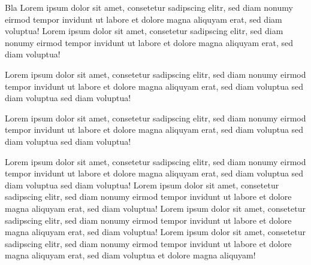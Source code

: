 \documentclass[
parindent=false,
parskip=true,
parts=true,
colortheme=wu,
styletheme=wu,
shownotess=true,
showresults=false
]{edu}
\begin{document}
\begin{cols}[4]
	Bla Lorem ipsum dolor sit amet, consetetur sadipscing elitr, sed diam nonumy eirmod tempor invidunt ut labore et dolore magna aliquyam erat, sed diam voluptua! Lorem ipsum dolor sit amet, consetetur sadipscing elitr, sed diam nonumy eirmod tempor invidunt ut labore et dolore magna aliquyam erat, sed diam voluptua! 
  	
  	Lorem ipsum dolor sit amet, consetetur sadipscing elitr, sed diam nonumy eirmod tempor invidunt ut labore et dolore magna aliquyam erat, sed diam voluptua sed diam voluptua sed diam voluptua! 
    
  	
  	Lorem ipsum dolor sit amet, consetetur sadipscing elitr, sed diam nonumy eirmod tempor invidunt ut labore et dolore magna aliquyam erat, sed diam voluptua sed diam voluptua sed diam voluptua! 
    \colbreak
  	
  	Lorem ipsum dolor sit amet, consetetur sadipscing elitr, sed diam nonumy eirmod tempor invidunt ut labore et dolore magna aliquyam erat, sed diam voluptua sed diam voluptua sed diam voluptua! 
    \colbreak
    Lorem ipsum dolor sit amet, consetetur sadipscing elitr, sed diam nonumy eirmod tempor invidunt ut labore et dolore magna aliquyam erat, sed diam voluptua! 
    \colbreak
    Lorem ipsum dolor sit amet, consetetur sadipscing elitr, sed diam nonumy eirmod tempor invidunt ut labore et dolore magna aliquyam erat, sed diam voluptua! Lorem ipsum dolor sit amet, consetetur sadipscing elitr, sed diam nonumy eirmod tempor invidunt ut labore et dolore magna aliquyam erat, sed diam voluptua et dolore magna aliquyam! 
\end{cols}
\end{document}
